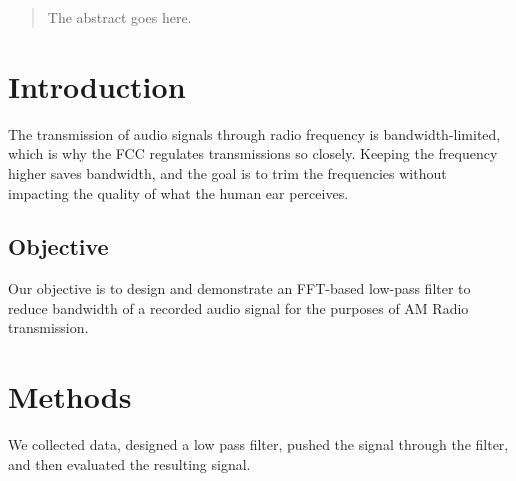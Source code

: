 



\maketitle

\begin{abstract}
The abstract goes here.
\end{abstract}





%
\IEEEpeerreviewmaketitle



\section{Introduction}
The transmission of audio signals through radio frequency is bandwidth-limited, which is why the FCC regulates transmissions so closely. Keeping the frequency higher saves bandwidth, and the goal is to trim the frequencies without impacting the quality of what the human ear perceives. 

\subsection{Objective}
Our objective is to design and demonstrate an FFT-based low-pass filter to reduce bandwidth of a recorded audio signal for the purposes of AM Radio transmission.

\section{Methods}
We collected data, designed a low pass filter, pushed the signal through the filter, and then evaluated the resulting signal.







